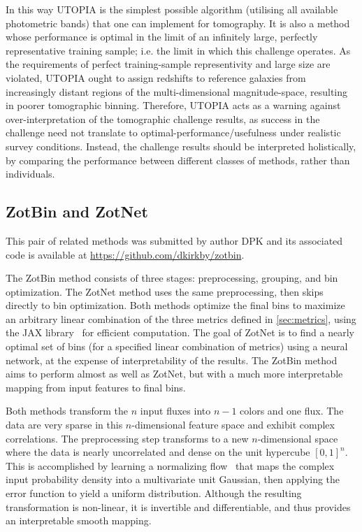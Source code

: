 \documentclass[twocolumn,twocolappendix]{aastex63}
\begin{document}
In this way UTOPIA is the simplest possible algorithm (utilising all available
photometric bands) that one can  implement for tomography. It is also a method
whose performance is optimal in the limit of an infinitely large,  perfectly
representative training sample; i.e. the limit in which this challenge operates.
As the requirements of perfect  training-sample representivity and large size
are violated, UTOPIA ought to assign redshifts to reference  galaxies from
increasingly distant regions of the multi-dimensional magnitude-space, resulting
in poorer tomographic binning.  Therefore, UTOPIA acts as a warning against
over-interpretation of the tomographic challenge results, as success in the
challenge  need not translate to optimal-performance/usefulness under realistic
survey conditions. Instead, the challenge results should be interpreted
holistically, by comparing the performance between different classes of methods,
rather than individuals. 



\subsection{ {\sc ZotBin and ZotNet} }

This pair of related methods was submitted by author DPK and its associated code is available at
\url{https://github.com/dkirkby/zotbin}.

The ZotBin method consists of three stages: preprocessing, grouping, and bin optimization.  The ZotNet method
uses the same preprocessing, then skips directly to bin optimization.  Both methods optimize the final bins to
maximize an arbitrary linear combination of the three metrics defined in \ref{sec:metrics}, using the JAX
library~\cite{jax} for efficient computation. The goal of ZotNet is to find a nearly optimal set of bins (for
a specified linear combination of metrics) using a neural network, at the expense of interpretability of the
results.  The ZotBin method aims to perform almost as well as ZotNet, but with a much more interpretable mapping
from input features to final bins.

Both methods transform the $n$ input fluxes into $n-1$ colors and one flux. The data are very sparse in this
$n$-dimensional feature space and exhibit complex correlations. The preprocessing step transforms to a new
$n$-dimensional space where the data is nearly uncorrelated and dense on the unit hypercube $[0,1]^n$. This is accomplished
by learning a normalizing flow~\cite{2019arXiv191202762P} that maps the complex input probability density
into a multivariate unit Gaussian, then applying the error function to yield a uniform distribution. Although
the resulting transformation is non-linear, it is invertible and differentiable, and thus provides an interpretable
smooth mapping.
\end{document}
